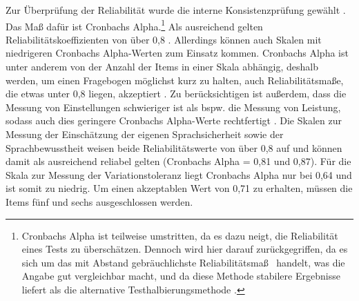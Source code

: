 \begin{sloppypar}
Zur Überprüfung der Reliabilität wurde die interne Konsistenzprüfung gewählt \citep[s.][467--469]{Doring2016}. 
Das Maß dafür ist Cronbachs Alpha.\footnote{Cronbachs Alpha ist teilweise umstritten, da es dazu neigt, die Reliabilität eines Tests zu überschätzen. Dennoch wird hier darauf zurückgegriffen, da es sich um \glqq das mit Abstand gebräuchlichste Reliabilitätsmaß\grqq{}~\citep[444]{Doring2016} handelt, was die Angabe gut vergleichbar macht, und da diese Methode stabilere Ergebnisse liefert als die alternative Testhalbierungsmethode \citep[s.][467]{Doring2016}.} 
Als ausreichend gelten Reliabilitätskoeffizienten von über 0,8 \citep[s.][443]{Doring2016}. 
Allerdings können auch Skalen mit niedrigeren Cronbachs Alpha-Werten zum Einsatz kommen. 
Cronbachs Alpha ist unter anderem von der Anzahl der Items in einer Skala abhängig, deshalb werden, um einen Fragebogen möglichst kurz zu halten, auch Reliabilitätsmaße, die etwas unter 0,8 liegen, akzeptiert \citep[s.][444]{Doring2016}. 
Zu berücksichtigen ist außerdem, dass die Messung von Einstellungen schwieriger ist als bspw. die Messung von Leistung, sodass auch dies geringere Cronbachs Alpha-Werte rechtfertigt \citep[s.][444]{Doring2016}. 
Die Skalen zur Messung der Einschätzung der eigenen Sprachsicherheit sowie der Sprachbewusstheit weisen beide Reliabilitätswerte von über 0,8 auf und können damit als ausreichend reliabel gelten (Cronbachs Alpha = 0,81 und 0,87). 
Für die Skala zur Messung der Variationstoleranz liegt Cronbachs Alpha nur bei 0,64 und ist somit zu niedrig. 
Um einen akzeptablen Wert von 0,71 zu erhalten, müssen die Items fünf und sechs ausgeschlossen werden. 
\end{sloppypar}


